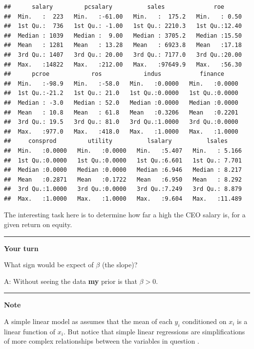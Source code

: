 \documentclass[]{book}
\begin{document}
\begin{verbatim}
##      salary         pcsalary          sales              roe       
##  Min.   :  223   Min.   :-61.00   Min.   :  175.2   Min.   : 0.50  
##  1st Qu.:  736   1st Qu.: -1.00   1st Qu.: 2210.3   1st Qu.:12.40  
##  Median : 1039   Median :  9.00   Median : 3705.2   Median :15.50  
##  Mean   : 1281   Mean   : 13.28   Mean   : 6923.8   Mean   :17.18  
##  3rd Qu.: 1407   3rd Qu.: 20.00   3rd Qu.: 7177.0   3rd Qu.:20.00  
##  Max.   :14822   Max.   :212.00   Max.   :97649.9   Max.   :56.30  
##      pcroe            ros            indus           finance      
##  Min.   :-98.9   Min.   :-58.0   Min.   :0.0000   Min.   :0.0000  
##  1st Qu.:-21.2   1st Qu.: 21.0   1st Qu.:0.0000   1st Qu.:0.0000  
##  Median : -3.0   Median : 52.0   Median :0.0000   Median :0.0000  
##  Mean   : 10.8   Mean   : 61.8   Mean   :0.3206   Mean   :0.2201  
##  3rd Qu.: 19.5   3rd Qu.: 81.0   3rd Qu.:1.0000   3rd Qu.:0.0000  
##  Max.   :977.0   Max.   :418.0   Max.   :1.0000   Max.   :1.0000  
##     consprod         utility          lsalary          lsales      
##  Min.   :0.0000   Min.   :0.0000   Min.   :5.407   Min.   : 5.166  
##  1st Qu.:0.0000   1st Qu.:0.0000   1st Qu.:6.601   1st Qu.: 7.701  
##  Median :0.0000   Median :0.0000   Median :6.946   Median : 8.217  
##  Mean   :0.2871   Mean   :0.1722   Mean   :6.950   Mean   : 8.292  
##  3rd Qu.:1.0000   3rd Qu.:0.0000   3rd Qu.:7.249   3rd Qu.: 8.879  
##  Max.   :1.0000   Max.   :1.0000   Max.   :9.604   Max.   :11.489
\end{verbatim}

The interesting task here is to determine how far a high the CEO salary
is, for a given return on equity.

\begin{center}\rule{0.5\linewidth}{\linethickness}\end{center}

\textbf{Your turn}

What sign would be expect of \(\beta\) (the slope)?

A: Without seeing the data \textbf{my} prior is that \(\beta > 0\).

\begin{center}\rule{0.5\linewidth}{\linethickness}\end{center}

\textbf{Note}

A simple linear model as assumes that the mean of each \(y_{i}\)
conditioned on \(x_{i}\) is a linear function of \(x_{i}\). But notice
that simple linear regressions are simplifications of more complex
relationships between the variables in question \citet{dalpiaz2016}.
\end{document}
